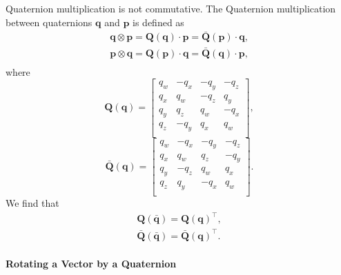 \documentclass[10pt,a4paper,fleqn]{article}
\newcommand{\qx}[0]{\ensuremath{q_x}}
\newcommand{\qy}[0]{\ensuremath{q_y}}
\newcommand{\qz}[0]{\ensuremath{q_z}}
\newcommand{\qw}[0]{\ensuremath{q_w}}
\newcommand{\bVec}[1]{\mathbf{#1}}
\begin{document}
Quaternion multiplication is not commutative. 
The Quaternion multiplication between quaternions $\bVec{q}$ and $\bVec{p}$ is defined as
%
\begin{align}
\bVec{q} \otimes \bVec{p} = \bVec{Q}\left(\bVec{q}\right) \cdot \bVec{p} = \bar{\bVec{Q}}\left(\bVec{p}\right) \cdot \bVec{q},\\
%
\bVec{p} \otimes \bVec{q} = \bVec{Q}\left(\bVec{p}\right) \cdot \bVec{q} = \bar{\bVec{Q}}\left(\bVec{q}\right)\cdot \bVec{p},\\
\end{align}
%
where 
%
\begin{equation}
\bVec{Q}\left(\bVec{q}\right) = 
\begin{bmatrix} 
	\qw & -\qx & -\qy & -\qz \\ 
	\qx &  \qw & -\qz &  \qy \\
	\qy &  \qz &  \qw & -\qx \\
	\qz & -\qy &  \qx &  \qw \\
\end{bmatrix},
\end{equation}
%
\begin{equation}
\bar{\bVec{Q}}\left(\bVec{q}\right) = 
\begin{bmatrix} 
	\qw & -\qx & -\qy & -\qz \\ 
	\qx &  \qw &  \qz & -\qy \\
	\qy & -\qz &  \qw &  \qx \\
	\qz &  \qy & -\qx &  \qw \\
\end{bmatrix}.
\end{equation}
%
We find that
%
\begin{align}
\bVec{Q}\left(\bar{\bVec{q}}\right) = \bVec{Q}\left(\bVec{q}\right)^{\top},\\
\bar{\bVec{Q}}\left(\bar{\bVec{q}}\right) = \bar{\bVec{Q}}\left(\bVec{q}\right)^{\top}.
\end{align}

\paragraph{Rotating a Vector by a Quaternion}
\end{document}
